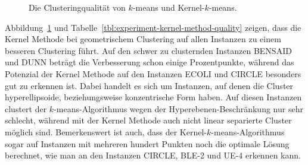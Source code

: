 \begin{figure}[h!]
	\centering
\caption{Die Clusteringqualität von $k$-means und Kernel-$k$-means.}
\label{fig:experiment-kernel-method-quality}
\end{figure}
Abbildung~\ref{fig:experiment-kernel-method-quality} und Tabelle~\ref{tbl:experiment-kernel-method-quality} zeigen, dass
die Kernel Methode bei geometrischem Clustering auf allen Instanzen zu einem besseren Clustering führt. Auf den schwer zu
clusternden Instanzen BENSAID und DUNN beträgt die Verbesserung schon einige Prozentpunkte, während das Potenzial der Kernel
Methode auf den Instanzen ECOLI und CIRCLE besonders gut zu erkennen ist. Dabei handelt es sich um Instanzen, auf denen die Cluster
hyperellipsoide, beziehungsweise konzentrische Form haben. Auf diesen Instanzen clustert der $k$-means-Algorithmus wegen der
Hyperebenen-Beschränkung nur sehr schlecht, während mit der Kernel Methode auch nicht linear separierte Cluster möglich sind.
Bemerkenswert ist auch, dass der Kernel-$k$-means-Algorithmus sogar auf Instanzen mit mehreren hundert Punkten noch die optimale
Lösung berechnet, wie man an den Instanzen CIRCLE, BLE-2 und UE-4 erkennen kann.

